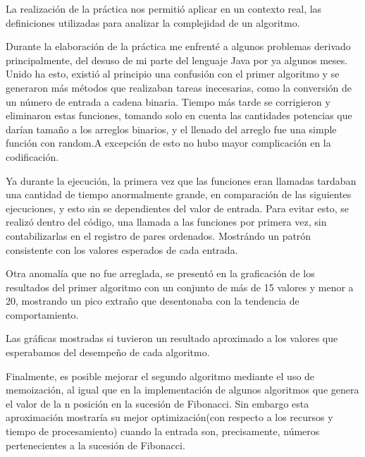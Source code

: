 \documentclass{report}
\begin{document}
    \vspace*{3\baselineskip}
    La realización de la práctica nos permitió aplicar en un contexto real, las definiciones utilizadas para analizar la complejidad de un algoritmo.
    
    Durante la elaboración de la práctica me enfrenté a algunos problemas derivado principalmente, del desuso de mi parte del lenguaje Java por ya algunos meses. 
    Unido ha esto, existió al principio una confusión con el primer algoritmo y se generaron más métodos que realizaban tareas inecesarias, como la conversión de un número de entrada a cadena binaria. Tiempo más tarde se corrigieron y eliminaron estas funciones, tomando solo en cuenta las cantidades potencias que darían tamaño a los arreglos binarios, y el llenado del arreglo fue una simple función con random.A excepción de esto no hubo mayor complicación en la codificación.
    
    Ya durante la ejecución, la primera vez que las funciones eran llamadas tardaban una cantidad de tiempo anormalmente grande, en comparación de las siguientes ejecuciones, y esto sin se dependientes del valor de entrada. Para evitar esto, se realizó dentro del código, una llamada a las funciones por primera vez, sin contabilizarlas en el registro de pares ordenados. Mostrándo un patrón consistente con los valores esperados de cada entrada.
    
    Otra anomalía que no fue arreglada, se presentó en la graficación de los resultados del primer algoritmo con un conjunto de más de 15 valores y menor a 20, mostrando un pico extraño que desentonaba con la tendencia de comportamiento.
    
    Las gráficas mostradas si tuvieron un resultado aproximado a los valores que esperabamos del desempeño de cada algoritmo.
    
    Finalmente, es posible mejorar el segundo algoritmo mediante el uso de memoización, al igual que en la implementación de algunos algoritmos que genera el valor de la n posición en la sucesión de Fibonacci. Sin embargo esta aproximación mostraría su mejor optimización(con respecto a los recursos y tiempo de procesamiento) cuando la entrada son, precisamente, números pertenecientes a la sucesión de Fibonacci.
\newpage
\end{document}
